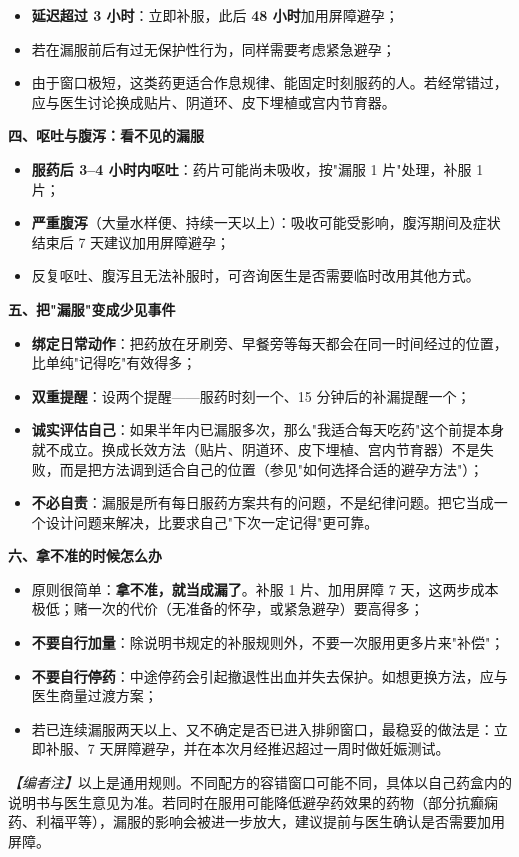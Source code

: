 \begin{itemize}
\item \textbf{延迟超过 3 小时}：立即补服，此后 \textbf{48 小时}加用屏障避孕；
\item 若在漏服前后有过无保护性行为，同样需要考虑紧急避孕；
\item 由于窗口极短，这类药更适合作息规律、能固定时刻服药的人。若经常错过，应与医生讨论换成贴片、阴道环、皮下埋植或宫内节育器。
\end{itemize}

\textbf{四、呕吐与腹泻：看不见的漏服}

\begin{itemize}
\item \textbf{服药后 3--4 小时内呕吐}：药片可能尚未吸收，按"漏服 1 片"处理，补服 1 片；
\item \textbf{严重腹泻}（大量水样便、持续一天以上）：吸收可能受影响，腹泻期间及症状结束后 7 天建议加用屏障避孕；
\item 反复呕吐、腹泻且无法补服时，可咨询医生是否需要临时改用其他方式。
\end{itemize}

\textbf{五、把"漏服"变成少见事件}

\begin{itemize}
\item \textbf{绑定日常动作}：把药放在牙刷旁、早餐旁等每天都会在同一时间经过的位置，比单纯"记得吃"有效得多；
\item \textbf{双重提醒}：设两个提醒——服药时刻一个、15 分钟后的补漏提醒一个；
\item \textbf{诚实评估自己}：如果半年内已漏服多次，那么"我适合每天吃药"这个前提本身就不成立。换成长效方法（贴片、阴道环、皮下埋植、宫内节育器）不是失败，而是把方法调到适合自己的位置（参见"如何选择合适的避孕方法"）；
\item \textbf{不必自责}：漏服是所有每日服药方案共有的问题，不是纪律问题。把它当成一个设计问题来解决，比要求自己"下次一定记得"更可靠。
\end{itemize}

\textbf{六、拿不准的时候怎么办}

\begin{itemize}
\item 原则很简单：\textbf{拿不准，就当成漏了}。补服 1 片、加用屏障 7 天，这两步成本极低；赌一次的代价（无准备的怀孕，或紧急避孕）要高得多；
\item \textbf{不要自行加量}：除说明书规定的补服规则外，不要一次服用更多片来"补偿"；
\item \textbf{不要自行停药}：中途停药会引起撤退性出血并失去保护。如想更换方法，应与医生商量过渡方案；
\item 若已连续漏服两天以上、又不确定是否已进入排卵窗口，最稳妥的做法是：立即补服、7 天屏障避孕，并在本次月经推迟超过一周时做妊娠测试。
\end{itemize}

\textit{【编者注】}以上是通用规则。不同配方的容错窗口可能不同，具体以自己药盒内的说明书与医生意见为准。若同时在服用可能降低避孕药效果的药物（部分抗癫痫药、利福平等），漏服的影响会被进一步放大，建议提前与医生确认是否需要加用屏障。

